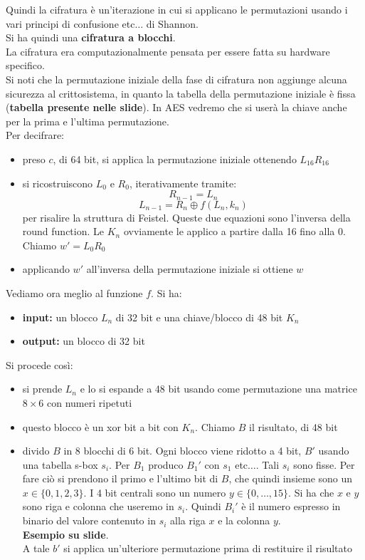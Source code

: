 \documentclass[a4paper,12pt, oneside]{book}
\begin{document}
Quindi la cifratura è un'iterazione in cui si applicano le permutazioni usando i
vari principi di confusione etc$\ldots$ di Shannon.\\
Si ha quindi una \textbf{cifratura a blocchi}.\\
La cifratura era computazionalmente pensata per essere fatta su hardware
specifico. \\
Si noti che la permutazione iniziale della fase di cifratura non aggiunge alcuna
sicurezza al crittosistema, in quanto la tabella della permutazione iniziale
è fissa (\textbf{tabella presente nelle slide}). In AES vedremo che si userà la
chiave anche per la prima e l'ultima permutazione.\\
Per decifrare:
\begin{itemize}
  \item preso $c$, di 64 bit, si applica la permutazione iniziale ottenendo
  $L_{16}R_{16}$
  \item si ricostruiscono $L_0$ e $R_0$, iterativamente tramite:
  \[R_{n-1}=L_n\]
  \[L_{n-1}=R_n\oplus f(L_n,k_n)\]
  per risalire la struttura di Feistel. Queste due equazioni sono l'inversa
  della round function. Le $K_n$ ovviamente le applico a partire
  dalla 16 fino alla 0.\\
  Chiamo $w'=L_0R_0$
  \item applicando $w'$ all'inversa della permutazione iniziale si ottiene $w$
\end{itemize}
Vediamo ora meglio al funzione $f$. Si ha:
\begin{itemize}
  \item \textbf{input:} un blocco $L_n$ di 32 bit e una chiave/blocco di 48 bit
  $K_n$ 
  \item \textbf{output:} un blocco di 32 bit
\end{itemize}
Si procede così:
\begin{itemize}
  \item si prende $L_n$ e lo si espande a 48 bit usando come permutazione una
  matrice $8\times 6$ con numeri ripetuti
  \item questo blocco è un xor bit a bit con $K_n$. Chiamo $B$ il risultato, di
  48 bit
  \item divido $B$ in 8 blocchi di 6 bit. Ogni blocco viene ridotto a 4 bit,
  $B'$  usando una tabella s-box $s_i$. Per $B_1$ produco $B_1'$ con $s_1$
  etc$\ldots$. Tali $s_i$ sono fisse. Per fare ciò si prendono il primo e
  l'ultimo bit di $B$, che quindi insieme sono un $x\in\{0,1,2,3\}$. I 4 bit
  centrali sono un numero $y\in\{0,\ldots,15\}$. Si ha che $x$ e $y$ sono riga e
  colonna che useremo in $s_i$. Quindi $B_i'$ è il numero espresso in binario
  del valore contenuto in $s_i$ alla riga $x$ e la colonna $y$.\\
  \textbf{Esempio su slide}.\\
  A tale $b'$ si applica un'ulteriore permutazione prima di restituire il
  risultato 
\end{itemize}
\end{document}

